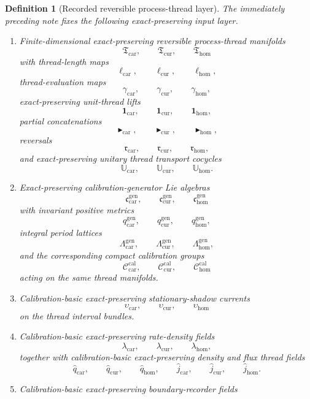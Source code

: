 \documentclass[11pt]{article}
\newcommand{\TensorCalGroup}{\mathcal C_{\mathrm{car}}^{\mathrm{cal}}}
\newcommand{\CurCalGroup}{\mathcal C_{\mathrm{cur}}^{\mathrm{cal}}}
\newcommand{\HomCalGroup}{\mathcal C_{\mathrm{hom}}^{\mathrm{cal}}}
\newcommand{\TensorThreadClass}{\mathfrak T_{\mathrm{car}}}
\newcommand{\CurThreadClass}{\mathfrak T_{\mathrm{cur}}}
\newcommand{\HomThreadClass}{\mathfrak T_{\mathrm{hom}}}
\newcommand{\TensorThreadLength}{\ell_{\mathrm{car}}}
\newcommand{\CurThreadLength}{\ell_{\mathrm{cur}}}
\newcommand{\HomThreadLength}{\ell_{\mathrm{hom}}}
\newcommand{\TensorThreadEval}{\gamma_{\mathrm{car}}}
\newcommand{\CurThreadEval}{\gamma_{\mathrm{cur}}}
\newcommand{\HomThreadEval}{\gamma_{\mathrm{hom}}}
\newcommand{\TensorThreadUnit}{\mathbf 1_{\mathrm{car}}}
\newcommand{\CurThreadUnit}{\mathbf 1_{\mathrm{cur}}}
\newcommand{\HomThreadUnit}{\mathbf 1_{\mathrm{hom}}}
\newcommand{\TensorThreadConcat}{\blacktriangleright_{\mathrm{car}}}
\newcommand{\CurThreadConcat}{\blacktriangleright_{\mathrm{cur}}}
\newcommand{\HomThreadConcat}{\blacktriangleright_{\mathrm{hom}}}
\newcommand{\TensorThreadRev}{\mathfrak r_{\mathrm{car}}}
\newcommand{\CurThreadRev}{\mathfrak r_{\mathrm{cur}}}
\newcommand{\HomThreadRev}{\mathfrak r_{\mathrm{hom}}}
\newcommand{\TensorThreadRep}{\mathbb U_{\mathrm{car}}}
\newcommand{\CurThreadRep}{\mathbb U_{\mathrm{cur}}}
\newcommand{\HomThreadRep}{\mathbb U_{\mathrm{hom}}}
\newcommand{\TensorCalLie}{\mathfrak c_{\mathrm{car}}^{\mathrm{gen}}}
\newcommand{\CurCalLie}{\mathfrak c_{\mathrm{cur}}^{\mathrm{gen}}}
\newcommand{\HomCalLie}{\mathfrak c_{\mathrm{hom}}^{\mathrm{gen}}}
\newcommand{\TensorCalMetric}{q_{\mathrm{car}}^{\mathrm{gen}}}
\newcommand{\CurCalMetric}{q_{\mathrm{cur}}^{\mathrm{gen}}}
\newcommand{\HomCalMetric}{q_{\mathrm{hom}}^{\mathrm{gen}}}
\newcommand{\TensorCalLat}{\Lambda_{\mathrm{car}}^{\mathrm{gen}}}
\newcommand{\CurCalLat}{\Lambda_{\mathrm{cur}}^{\mathrm{gen}}}
\newcommand{\HomCalLat}{\Lambda_{\mathrm{hom}}^{\mathrm{gen}}}
\newcommand{\TensorShadowDensity}{\upsilon_{\mathrm{car}}}
\newcommand{\CurShadowDensity}{\upsilon_{\mathrm{cur}}}
\newcommand{\HomShadowDensity}{\upsilon_{\mathrm{hom}}}
\newcommand{\TensorRateDensity}{\lambda_{\mathrm{car}}}
\newcommand{\CurRateDensity}{\lambda_{\mathrm{cur}}}
\newcommand{\HomRateDensity}{\lambda_{\mathrm{hom}}}
\newcommand{\TensorDensityField}{\widehat q_{\mathrm{car}}}
\newcommand{\CurDensityField}{\widehat q_{\mathrm{cur}}}
\newcommand{\HomDensityField}{\widehat q_{\mathrm{hom}}}
\newcommand{\TensorFluxField}{\widehat j_{\mathrm{car}}}
\newcommand{\CurFluxField}{\widehat j_{\mathrm{cur}}}
\newcommand{\HomFluxField}{\widehat j_{\mathrm{hom}}}
\newtheorem{definition}{Definition}
\begin{document}
\begin{definition}[Recorded reversible process-thread layer]
\label{def:recorded_layer}
The immediately preceding note fixes the following exact-preserving input layer.
\begin{enumerate}
    \item Finite-dimensional exact-preserving reversible process-thread manifolds
    \[
    \TensorThreadClass,\qquad
    \CurThreadClass,\qquad
    \HomThreadClass
    \]
    with thread-length maps
    \[
    \TensorThreadLength,\qquad
    \CurThreadLength,\qquad
    \HomThreadLength,
    \]
    thread-evaluation maps
    \[
    \TensorThreadEval,\qquad
    \CurThreadEval,\qquad
    \HomThreadEval,
    \]
    exact-preserving unit-thread lifts
    \[
    \TensorThreadUnit,\qquad
    \CurThreadUnit,\qquad
    \HomThreadUnit,
    \]
    partial concatenations
    \[
    \TensorThreadConcat,\qquad
    \CurThreadConcat,\qquad
    \HomThreadConcat,
    \]
    reversals
    \[
    \TensorThreadRev,\qquad
    \CurThreadRev,\qquad
    \HomThreadRev,
    \]
    and exact-preserving unitary thread transport cocycles
    \[
    \TensorThreadRep,\qquad
    \CurThreadRep,\qquad
    \HomThreadRep.
    \]
    \item Exact-preserving calibration-generator Lie algebras
    \[
    \TensorCalLie,\qquad
    \CurCalLie,\qquad
    \HomCalLie
    \]
    with invariant positive metrics
    \[
    \TensorCalMetric,\qquad
    \CurCalMetric,\qquad
    \HomCalMetric,
    \]
    integral period lattices
    \[
    \TensorCalLat,\qquad
    \CurCalLat,\qquad
    \HomCalLat,
    \]
    and the corresponding compact calibration groups
    \[
    \TensorCalGroup,\qquad
    \CurCalGroup,\qquad
    \HomCalGroup
    \]
    acting on the same thread manifolds.
    \item Calibration-basic exact-preserving stationary-shadow currents
    \[
    \TensorShadowDensity,\qquad
    \CurShadowDensity,\qquad
    \HomShadowDensity
    \]
    on the thread interval bundles.
    \item Calibration-basic exact-preserving rate-density fields
    \[
    \TensorRateDensity,\qquad
    \CurRateDensity,\qquad
    \HomRateDensity,
    \]
    together with calibration-basic exact-preserving density and flux thread fields
    \[
    \TensorDensityField,\qquad
    \CurDensityField,\qquad
    \HomDensityField,\qquad
    \TensorFluxField,\qquad
    \CurFluxField,\qquad
    \HomFluxField.
    \]
    \item Calibration-basic exact-preserving boundary-recorder fields

\end{enumerate}
\end{definition}
\end{document}
